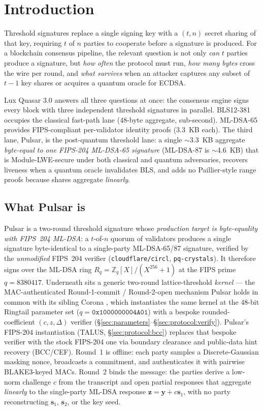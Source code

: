 \section{Introduction}
\label{sec:introduction}

Threshold signatures replace a single signing key with a $(t,n)$ secret sharing of that key, requiring $t$ of $n$ parties to cooperate before a signature is produced. For a blockchain consensus pipeline, the relevant question is not only \emph{can} $t$ parties produce a signature, but \emph{how often} the protocol must run, \emph{how many bytes} cross the wire per round, and \emph{what survives} when an attacker captures any subset of $t-1$ key shares or acquires a quantum oracle for ECDSA.

Lux Quasar 3.0 \cite{lp020} answers all three questions at once: the consensus engine signs every block with three independent threshold signatures in parallel. BLS12-381 \cite{lp075} occupies the classical fast-path lane (48-byte aggregate, sub-second). ML-DSA-65 \cite{lp070} provides FIPS-compliant per-validator identity proofs (3.3~KB each). The third lane, Pulsar, is the post-quantum threshold lane: a single $\sim$3.3~KB aggregate \emph{byte-equal to one FIPS-204 ML-DSA-65 signature} (ML-DSA-87 is $\sim$4.6~KB) that is Module-LWE-secure under both classical and quantum adversaries, recovers liveness when a quantum oracle invalidates BLS, and adds no Paillier-style range proofs because shares aggregate \emph{linearly}.

\subsection{What Pulsar is}

Pulsar is a two-round threshold signature whose \emph{production target is byte-equality with FIPS~204 ML-DSA}: a $t$-of-$n$ quorum of validators produces a single signature byte-identical to a single-party ML-DSA-65/87 signature, verified by the \emph{unmodified} FIPS~204 verifier (\texttt{cloudflare/circl}, \texttt{pq-crystals}). It therefore signs over the ML-DSA ring $R_q = \mathbb{Z}_q[X]/(X^{256}+1)$ at the FIPS prime $q = 8380417$. Underneath sits a generic two-round lattice-threshold \emph{kernel} --- the MAC-authenticated Round-1-commit / Round-2-open mechanism Pulsar holds in common with its sibling Corona \cite{corona}, which instantiates the same kernel at the 48-bit Ringtail parameter set ($q = \mathtt{0x1000000004A01}$) with a bespoke rounded-coefficient $(c, z, \Delta)$ verifier (\S\ref{sec:parameters}--\S\ref{sec:protocol:verify}). Pulsar's FIPS-204 instantiation (TALUS, \S\ref{sec:protocol:bcc}) replaces that bespoke verifier with the stock FIPS-204 one via boundary clearance and public-data hint recovery (BCC/CEF). Round~1 is offline: each party samples a Discrete-Gaussian masking nonce, broadcasts a commitment, and authenticates it with pairwise BLAKE3-keyed MACs. Round~2 binds the message: the parties derive a low-norm challenge $c$ from the transcript and open partial responses that aggregate \emph{linearly} to the single-party ML-DSA response $\mathbf{z} = \mathbf{y} + c\mathbf{s}_1$, with no party reconstructing $\mathbf{s}_1$, $\mathbf{s}_2$, or the key seed.


